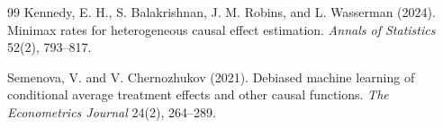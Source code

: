 \documentclass[11pt]{article}
\theoremstyle{definition}
\theoremstyle{plain}
\theoremstyle{remark}
\begin{document}
\begin{thebibliography}{99}
Kennedy, E. H., S. Balakrishnan, J. M. Robins, and L. Wasserman (2024).
\newblock Minimax rates for heterogeneous causal effect estimation.
\newblock \emph{Annals of Statistics} 52(2), 793--817.

Semenova, V. and V. Chernozhukov (2021).
\newblock Debiased machine learning of conditional average treatment effects and other causal functions.
\newblock \emph{The Econometrics Journal} 24(2), 264--289.
\end{thebibliography}
\end{document}
